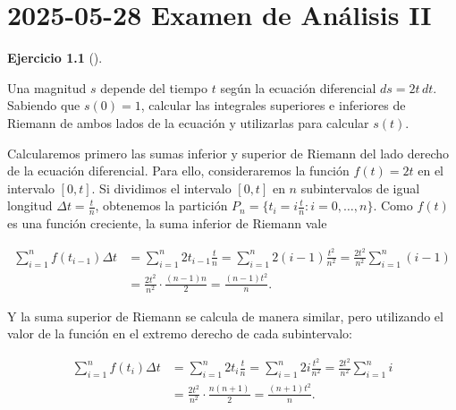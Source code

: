 \documentclass[
  spanish,
  a4paper,
]{scrreport}
\theoremstyle{definition}
\newtheorem{exercise}{Ejercicio}[chapter]
\theoremstyle{remark}
\begin{document}
\chapter{\texorpdfstring{2025-05-28 Examen de Análisis
II}{2025-05-28  Examen de Análisis II}}\label{examen-de-anuxe1lisis-ii-5}

\begin{exercise}[]\protect\hypertarget{exr-1}{}\label{exr-1}

Una magnitud \(s\) depende del tiempo \(t\) según la ecuación
diferencial \(ds = 2t\,dt\). Sabiendo que \(s(0) = 1\), calcular las
integrales superiores e inferiores de Riemann de ambos lados de la
ecuación y utilizarlas para calcular \(s(t)\).

\end{exercise}

\begin{tcolorbox}[enhanced jigsaw, colbacktitle=quarto-callout-tip-color!10!white, opacityback=0, toptitle=1mm, title=\textcolor{quarto-callout-tip-color}{\faLightbulb}\hspace{0.5em}{Solución}, coltitle=black, opacitybacktitle=0.6, breakable, toprule=.15mm, leftrule=.75mm, titlerule=0mm, colframe=quarto-callout-tip-color-frame, left=2mm, bottomrule=.15mm, bottomtitle=1mm, arc=.35mm, rightrule=.15mm, colback=white]

Calcularemos primero las sumas inferior y superior de Riemann del lado
derecho de la ecuación diferencial. Para ello, consideraremos la función
\(f(t) = 2t\) en el intervalo \([0,t]\). Si dividimos el intervalo
\([0,t]\) en \(n\) subintervalos de igual longitud
\(\Delta t = \frac{t}{n}\), obtenemos la partición
\(P_n = \{t_i = i\frac{t}{n}: i = 0, \ldots, n\}\). Como \(f(t)\) es una
función creciente, la suma inferior de Riemann vale

\begin{align*}
\sum_{i=1}^{n} f(t_{i-1}) \Delta t 
&= \sum_{i=1}^{n} 2t_{i-1} \frac{t}{n}
= \sum_{i=1}^{n} 2(i-1)\frac{t^2}{n^2}
= \frac{2t^2}{n^2} \sum_{i=1}^{n} (i-1) \\
&= \frac{2t^2}{n^2} \cdot \frac{(n-1)n}{2} 
= \frac{(n-1)t^2}{n}.
\end{align*}

Y la suma superior de Riemann se calcula de manera similar, pero
utilizando el valor de la función en el extremo derecho de cada
subintervalo:

\begin{align*}
\sum_{i=1}^{n} f(t_i) \Delta t
&= \sum_{i=1}^{n} 2t_i \frac{t}{n} 
= \sum_{i=1}^{n} 2i\frac{t^2}{n^2} 
= \frac{2t^2}{n^2} \sum_{i=1}^{n} i \\
&= \frac{2t^2}{n^2} \cdot \frac{n(n+1)}{2} 
= \frac{(n+1)t^2}{n}.
\end{align*}


\end{tcolorbox}
\end{document}
